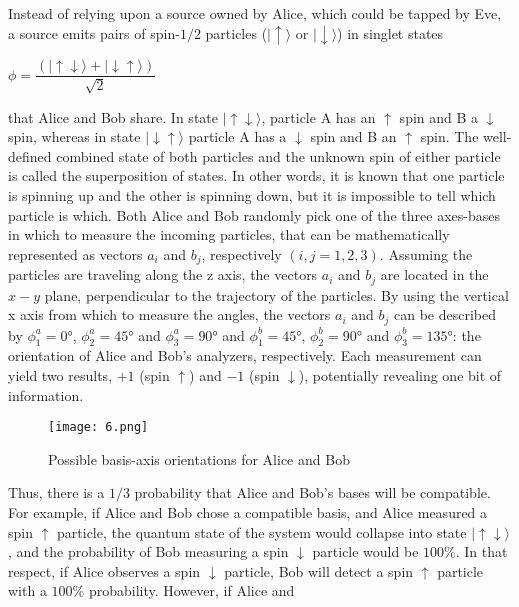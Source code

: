Instead of relying upon a source owned by Alice, which could be tapped by Eve, a source
emits pairs of spin-$1/2$ particles ($|{\bm{\uparrow}}\rangle$ or $|{\bm{\downarrow}}\rangle$) in singlet states
\begin{center}
    $\phi = \dfrac{(|{\bm{\uparrow}\bm{\downarrow}}\rangle + |{\bm{\downarrow}\bm{\uparrow}}\rangle)}{\sqrt{2}}$
\end{center}
that Alice and Bob share.
In state $|{\bm{\uparrow}\bm{\downarrow}}\rangle$, 
particle A has an $\bm{\uparrow}$ spin and B a $\bm{\downarrow}$ spin, 
whereas in state $|{\bm{\downarrow}\bm{\uparrow}}\rangle$ particle A
has a $\bm{\downarrow}$ spin and B an $\bm{\uparrow}$ spin. 
The well-defined combined state of both particles and the unknown spin of either particle 
is called the superposition of states. In other words, it is known that one particle is spinning up 
and the other is spinning down, but it is impossible to tell which particle is which.
Both Alice and Bob randomly pick one of the three axes-bases in which to measure the
incoming particles, that can be mathematically represented as vectors
$a_{i}$ and $b_{j}$, respectively $(i, j = 1, 2, 3)$.
Assuming the particles are traveling along the z axis, the vectors $a_{i}$ and $b_{j}$ are
located in the $x-y$ plane, perpendicular to the trajectory of the particles.
By using the vertical x axis from which to measure the angles, the vectors
$a_{i}$ and $b_{j}$ can be described by 
$\phi^{a}_{1}= \ang{0}$, $\phi^{a}_{2}= \ang{45}$ and $\phi^{a}_{3}= \ang{90}$ and 
$\phi^{b}_{1}= \ang{45}$, $\phi^{b}_{2}= \ang{90}$ and $\phi^{b}_{3}= \ang{135}$: 
the orientation of Alice and Bob's analyzers, respectively. 
Each measurement can yield two results, $+1$ (spin $\bm{\uparrow}$) and $-1$ (spin $\bm{\downarrow}$), 
potentially revealing one bit of information.
\begin{figure}[!h]
\centering
\texttt{[image: 6.png]}
\caption{Possible basis-axis orientations for Alice and Bob}
\label{fig6}
\end{figure}
Thus, there is a $1/3$ probability that Alice and Bob’s bases will be compatible. For
example, if Alice and Bob chose a compatible basis, and Alice measured a spin $\bm{\uparrow}$ particle,
the quantum state of the system would collapse into state $|{\bm{\uparrow}\bm{\downarrow}}\rangle$, and the probability of Bob
measuring a spin $\bm{\downarrow}$ particle would be $100\%$. In that respect, if Alice observes a spin $\bm{\downarrow}$
particle, Bob will detect a spin $\bm{\uparrow}$ particle with a $100\%$ probability. However, if Alice and
